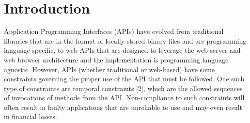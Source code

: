 \section{Introduction}
\label{sec:introduction}




Application Programming Interfaces (APIs) have evolved from traditional libraries that are in the format of locally stored binary files and are programming language specific,
to web APIs that are designed to leverage the web server and web browser architecture and the implementation is programming language agnostic.
However, APIs (whether traditional or web-based) have some constraints governing the proper use of the API that must be followed.
One such type of constraints are temporal constraints [2], which are the allowed sequences of invocations of methods from the API.
Non-compliance to such constraints will often result in faulty applications that are unreliable to use and may even result in financial losses.


